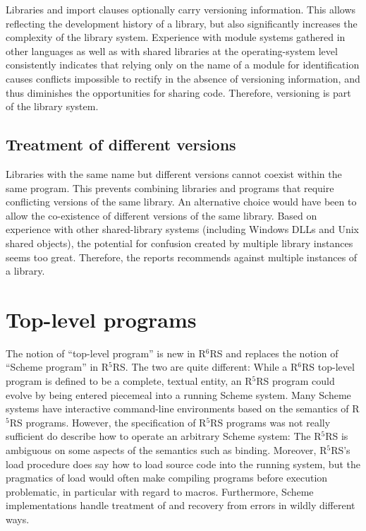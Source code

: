 \documentclass[twoside,twocolumn]{algol60}
\newcommand{\rn}[1]{R$^{#1}$RS}
\begin{document}
Libraries and {\cf import} clauses optionally carry versioning
information.  This allows reflecting the development history of a
library, but also significantly increases the complexity of the
library system.  Experience with module systems gathered in other
languages as well as with shared libraries at the operating-system
level consistently indicates that relying only on the name of a module
for identification causes conflicts impossible to rectify in the
absence of versioning information, and thus diminishes the
opportunities for sharing code.  Therefore, versioning is part of the
library system.

\section{Treatment of different versions}

Libraries with the same name but different versions cannot coexist
within the same program.  This prevents combining libraries and
programs that require conflicting versions of the same library.  An
alternative choice would have been to allow the co-existence of
different versions of the same library.  Based on experience with
other shared-library systems (including Windows DLLs and Unix shared
objects), the potential for confusion created by multiple library
instances seems too great.  Therefore, the reports recommends against
multiple instances of a library.

\chapter{Top-level programs}

The notion of ``top-level program'' is new in \rn{6} and replaces the
notion of ``Scheme program'' in \rn{5}.  The two are quite different:
While a \rn{6} top-level program is defined to be a complete, textual
entity, an \rn{5} program could evolve by being entered piecemeal into
a running Scheme system.  Many Scheme systems have interactive
command-line environments based on the semantics of \rn{5} programs.
However, the specification of \rn{5} programs was not really
sufficient do describe how to operate an arbitrary Scheme system: The
\rn{5} is ambiguous on some aspects of the semantics such as binding.
Moreover, \rn{5}'s {\cf load} procedure does say how to load source
code into the running system, but the pragmatics of {\cf load} would
often make compiling programs before execution problematic, in
particular with regard to macros.  Furthermore, Scheme implementations
handle treatment of and recovery from errors in wildly different ways.
\end{document}
